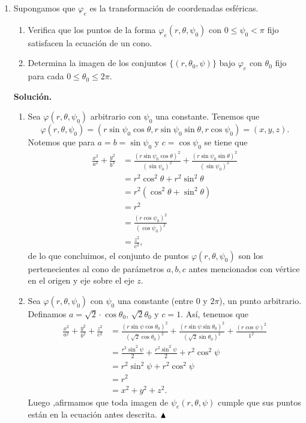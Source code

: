 \documentclass[12pt]{article}
\begin{document}
\begin{enumerate}
\newpage
\item Supongamos que $\varphi_e$ es la transformaci\'on de coordenadas esf\'ericas.
\begin{enumerate}[(1)]
\item Verifica que los puntos de la forma $\varphi_e(r,\theta,\psi_0)$ con $0\leq \psi_0<\pi$ fijo satisfacen la ecuaci\'on de un cono.
\item Determina la imagen de los conjuntos $\{(r,\theta_0,\psi)\}$  bajo 
$\varphi_e$ con $\theta_0$ fijo para cada $0\leq \theta_0\leq 2 \pi$.
\end{enumerate}
\textbf{Solución.}
\begin{enumerate}[(1)]
    \item Sea $\varphi(r,\theta,\psi_0)$ arbitrario con $\psi_0$ una constante. Tenemos que
    \[
    \varphi(r,\theta,\psi_0)=(r\sin\psi_0\cos\theta,r\sin\psi_0\sin\theta,r\cos\psi_0)=(x,y,z).
    \]
    Notemos que para $a=b=\sin\psi_0$ y $c=\cos\psi_0$ se tiene que
    \begin{align*}
        \frac{x^2}{a^2}+\frac{y^2}{b^2} &= \frac{(r\sin\psi_0\cos\theta)^2}{(\sin\psi_0)^2} + \frac{(r\sin\psi_0\sin\theta)^2}{(\sin\psi_0)^2} \\
        &= r^2\cos^2\theta + r^2\sin^2\theta \\
        &= r^2(\cos^2\theta+\sin^2\theta) \\
        &= r^2 \\
        &= \frac{(r\cos\psi_0)^2}{(\cos\psi_0)^2} \\
        &= \frac{z^2}{c^2},
    \end{align*}
    de lo que concluimos, el conjunto de puntos $\varphi(r,\theta,\psi_0)$ son los pertenecientes al cono de parámetros $a,b,c$ antes mencionados con vértice en el origen y eje sobre el eje $z$.
    \item Sea $\varphi(r,\theta,\psi_0)$ con $\psi_0$ una constante (entre $0$ y $2\pi$), un punto arbitrario. \\ Definamos $a=\sqrt{2}\cdot \cos \theta_0$, $\sqrt{2}\theta_0$ y $c=1$. Así, tenemos que
    \begin{align*}
        \frac{x^2}{a^2} + \frac{y^2}{b^2} + \frac{z^2}{c^2} &= \frac{(r\sin\psi\cos\theta_0)^2}{(\sqrt{2}\cos\theta_0)^2} + \frac{(r\sin\psi\sin\theta_0)^2}{(\sqrt{2}\sin\theta_0)^2} + \frac{(r\cos\psi)^2}{1^2} \\
        &= \frac{r^2\sin^2\psi}{2} + \frac{r^2\sin^2\psi}{2} + r^2\cos^2\psi \\
        &= r^2\sin^2\psi + r^2\cos^2\psi \\
        &= r^2 \\
        &= x^2+y^2+z^2.
    \end{align*}
    Luego ,afirmamos que toda imagen de $\psi_{e}(r,\theta,\psi)$ cumple que sus puntos están en la ecuación antes descrita. $\hfill \blacktriangle$
\end{enumerate}


\end{enumerate}
\end{document}
